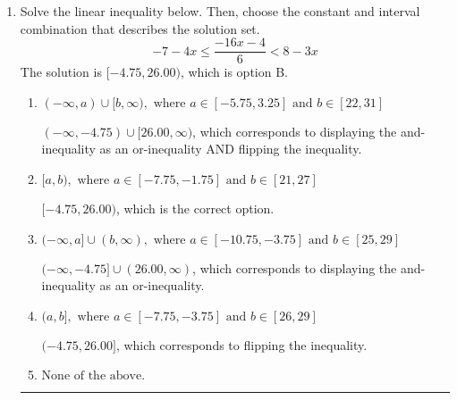 \documentclass{extbook}[14pt]
\newcommand{\litem}[1]{\item #1

\rule{\textwidth}{0.4pt}}
\begin{document}
\begin{enumerate}
{\begin{enumerate}[label=\Alph*.]
 * Correct option.
\item \( (-\infty, a] \cup [b, \infty), \text{ where } a \in [-10, -5] \text{ and } b \in [-2, 0] \)

Corresponds to including the endpoints AND negating.
\item \( (-\infty, a] \cup [b, \infty), \text{ where } a \in [-2, 2] \text{ and } b \in [6, 7] \)

Corresponds to including the endpoints (when they should be excluded).
\item \( (-\infty, a) \cup (b, \infty), \text{ where } a \in [-6, -2] \text{ and } b \in [-4, 3] \)

Corresponds to inverting the inequality and negating the solution.
\item \( (-\infty, \infty) \)

Corresponds to the variable canceling, which does not happen in this instance.
\end{enumerate}

\textbf{General Comment:} When multiplying or dividing by a negative, flip the sign.
}
\litem{
Solve the linear inequality below. Then, choose the constant and interval combination that describes the solution set.
\[ -7 - 4 x \leq \frac{-16 x - 4}{6} < 8 - 3 x \]
The solution is \( [-4.75, 26.00) \), which is option B.\begin{enumerate}[label=\Alph*.]
\item \( (-\infty, a) \cup [b, \infty), \text{ where } a \in [-5.75, 3.25] \text{ and } b \in [22, 31] \)

$(-\infty, -4.75) \cup [26.00, \infty)$, which corresponds to displaying the and-inequality as an or-inequality AND flipping the inequality.
\item \( [a, b), \text{ where } a \in [-7.75, -1.75] \text{ and } b \in [21, 27] \)

$[-4.75, 26.00)$, which is the correct option.
\item \( (-\infty, a] \cup (b, \infty), \text{ where } a \in [-10.75, -3.75] \text{ and } b \in [25, 29] \)

$(-\infty, -4.75] \cup (26.00, \infty)$, which corresponds to displaying the and-inequality as an or-inequality.
\item \( (a, b], \text{ where } a \in [-7.75, -3.75] \text{ and } b \in [26, 29] \)

$(-4.75, 26.00]$, which corresponds to flipping the inequality.
\item \( \text{None of the above.} \)



\end{enumerate}}
\end{enumerate}
\end{document}
